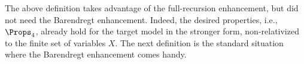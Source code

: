 The above definition takes advantage of the full-recursion enhancement, 
but did not need the Barendregt enhancement. Indeed, the desired properties, 
i.e., $\Props_4$, already hold for the target model 
in the stronger form, non-relativized to the finite set of variables $X$. 
%
The next definition is the standard situation where the Barendregt enhancement comes handy.


